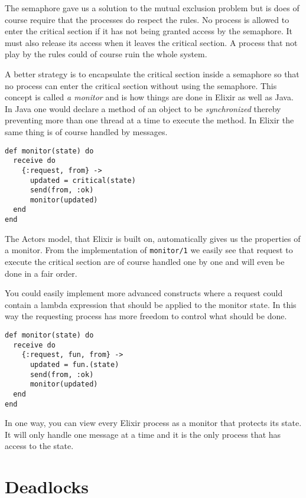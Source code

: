 \documentclass[a4paper,11pt]{article}
\begin{document}
The semaphore gave us a solution to the mutual exclusion problem but
is does of course require that the processes do respect the rules. No
process is allowed to enter the critical section if it has not being
granted access by the semaphore. It must also release its access when
it leaves the critical section. A process that not play by the rules
could of course ruin the whole system.

A better strategy is to encapsulate the critical section inside a
semaphore so that no process can enter the critical section without
using the semaphore. This concept is called {\em a monitor} and is how
things are done in Elixir as well as Java. In Java one would declare a
method of an object to be {\em synchronized} thereby preventing more
than one thread at a time to execute the method. In Elixir the same
thing is of course handled by messages.

\begin{verbatim}
def monitor(state) do
  receive do
    {:request, from} ->
      updated = critical(state)
      send(from, :ok)
      monitor(updated)
  end
end
\end{verbatim}

The Actors model, that Elixir is built on, automatically gives us the
properties of a monitor. From the implementation of {\tt monitor/1}
we easily see that request to execute the critical section are of
course handled one by one and will even be done in a fair order.

You could easily implement more advanced constructs where a request
could contain a lambda expression that should be applied to the
monitor state. In this way the requesting process has more freedom to
control what should be done.

\begin{verbatim}
def monitor(state) do
  receive do
    {:request, fun, from} ->
      updated = fun.(state)
      send(from, :ok)
      monitor(updated)
  end
end
\end{verbatim}

In one way, you can view every Elixir process as a monitor that
protects its state. It will only handle one message at a time and it
is the only process that has access to the state.



\section{Deadlocks}
\end{document}
